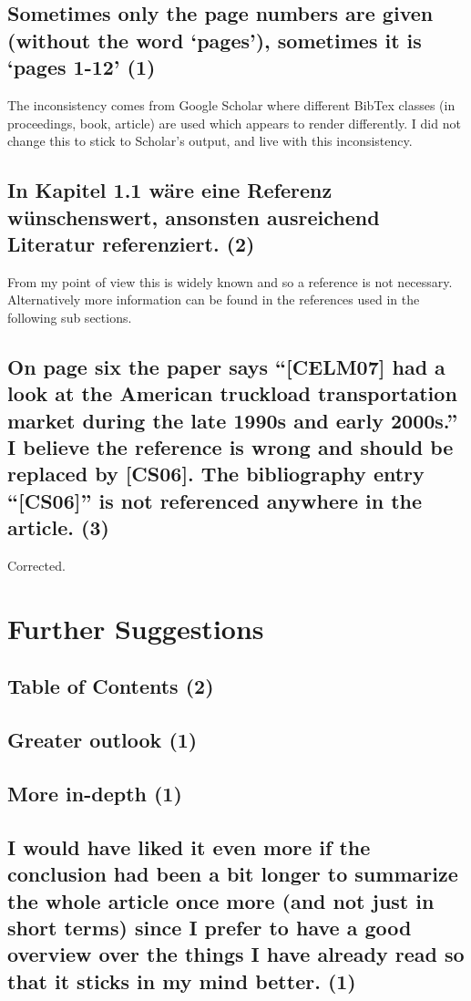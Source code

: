\documentclass{"../../Datenanalyse/assignments/latex-brookesassignment/brookes-assignment"}
\begin{document}
\subsection{Sometimes only the page numbers are given (without the word `pages'), sometimes it is `pages 1-12' (1)}
The inconsistency comes from Google Scholar where different BibTex classes (in proceedings, book, article) are used which appears to render differently. I did not change this to stick to Scholar's output, and live with this inconsistency.
\subsection{In Kapitel 1.1 wäre eine Referenz wünschenswert, ansonsten ausreichend Literatur referenziert. (2)}
From my point of view this is widely known and so a reference is not necessary. Alternatively more information can be found in the references used in the following sub sections.
\subsection{On page six the paper says ``[CELM07] had a look at the American truckload transportation market during the late 1990s and early 2000s.'' I believe the reference is wrong and should be replaced by [CS06]. The bibliography entry ``[CS06]'' is not referenced anywhere in the article. (3)}
Corrected.

\section{Further Suggestions}
\subsection{Table of Contents (2)}
\subsection{Greater outlook (1)}
\subsection{More in-depth (1)}
\subsection{I would have liked it even more if the conclusion had been a bit longer to summarize the whole article once more (and not just in short terms) since I prefer to have a good overview over the things I have already read so that it sticks in my mind better. (1)}
\end{document}
